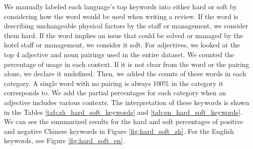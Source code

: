 \documentclass[smallextended,natbib]{svjour3}       %
\begin{document}
    We manually labeled each language's top keywords into either hard or soft by considering how the word would be used when writing a review. If the word is describing unchangeable physical factors by the staff or management, we consider them hard. If the word implies an issue that could be solved or managed by the hotel staff or management, we consider it soft. For adjectives, we looked at the top 4 adjective and noun pairings used in the entire dataset. We counted the percentage of usage in each context. If it is not clear from the word or the pairing alone, we declare it undefined. Then, we added the counts of these words in each category. A single word with no pairing is always 100\% in the category it corresponds to. We add the partial percentages for each category when an adjective includes various contexts. The interpretation of these keywords is shown in the Tables \ref{tab:zh_hard_soft_keywords} and \ref{tab:en_hard_soft_keywords}. We can see the summarized results for the hard and soft percentages of positive and negative Chinese keywords in Figure \ref{fig:hard_soft_zh}. For the English keywords, see Figure \ref{fig:hard_soft_en}.
\end{document}
